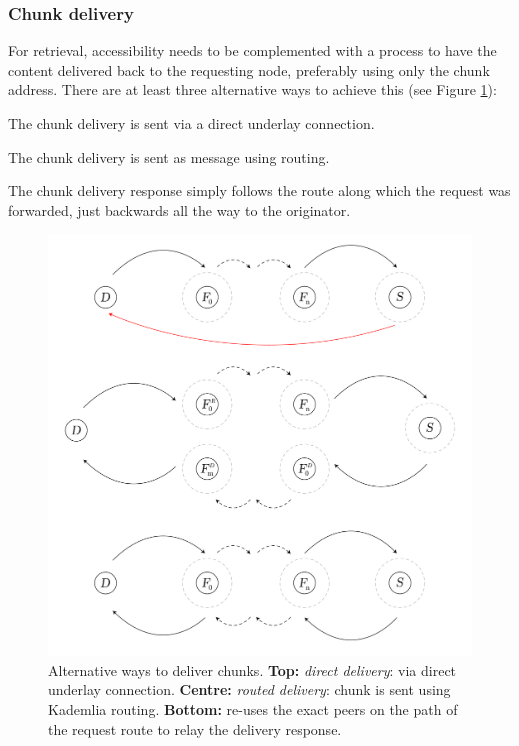 \subsubsection{Chunk delivery}

For retrieval, accessibility needs to be complemented with a process to have the content delivered back to the requesting node, preferably using only the chunk address. There are at least three alternative ways to achieve this (see Figure \ref{fig:chunk-delivery}):

\begin{labelledlist}
    \item[\gloss{direct delivery}] The chunk delivery is sent via a direct underlay connection. 
    \item[\gloss{routed delivery}] The chunk delivery is sent as message using routing.
    \item[\gloss{backwarding}] The chunk delivery response simply follows the route along which the request was forwarded, just backwards all the way to the originator.
\end{labelledlist}


\begin{figure}[htbp]
   \centering
   \includegraphics[width=\textwidth]{fig/chunk-delivery.pdf}
   \caption[Alternative ways to deliver chunks: direct, routed and backward \statusgreen]{Alternative ways to deliver chunks. \textbf{Top:} \emph{direct delivery}: via direct underlay connection. \textbf{Centre:} \emph{routed delivery}: chunk is sent using Kademlia routing. \textbf{Bottom:}  re-uses the exact peers on the path of the request route to relay the delivery response.}
   \label{fig:chunk-delivery}
\end{figure}


